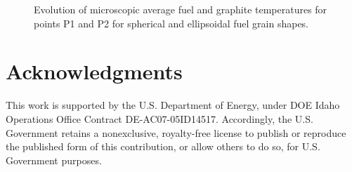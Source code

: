 \documentclass{anstrans}
\begin{document}
\begin{figure}[t!] %
\caption{Evolution of microscopic average fuel and graphite temperatures for points P1 and P2 for spherical and ellipsoidal fuel grain shapes. \label{fig:micro_heat_cond}}
\end{figure}

\section{Acknowledgments}
This work is supported by the U.S. Department of Energy, under DOE Idaho Operations Office Contract DE-AC07-05ID14517. Accordingly, the U.S. Government retains a nonexclusive, royalty-free license to publish or reproduce the published form of this contribution, or allow others to do so, for U.S. Government purposes.
\end{document}
